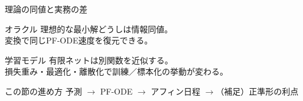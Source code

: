 \asmain
\begin{frame}{理論の同値と実務の差}
    \begin{block}{オラクル}
        理想的な最小解どうしは情報同値。\\
        変換で同じPF-ODE速度を復元できる。
    \end{block}
    \begin{alertblock}{学習モデル}
        有限ネットは別関数を近似する。\\
        損失重み・最適化・離散化で訓練／標本化の挙動が変わる。
    \end{alertblock}
    \begin{exampleblock}{この節の進め方}
        予測 $\to$ PF-ODE $\to$ アフィン日程 $\to$（補足）正準形の利点
    \end{exampleblock}
\end{frame}
